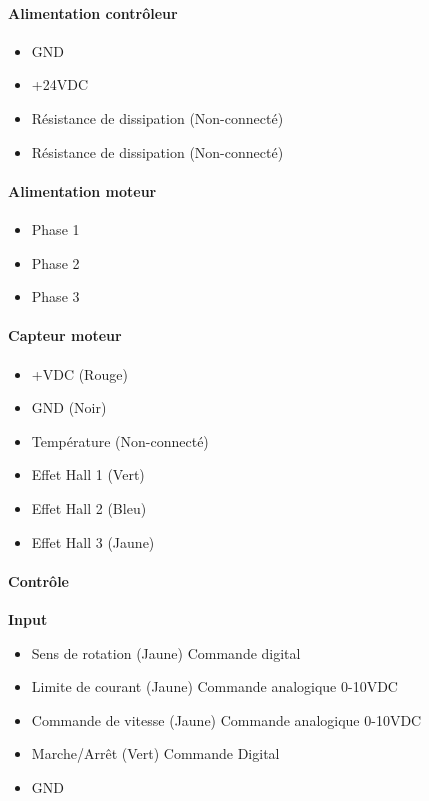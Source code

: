 \documentclass[11pt]{article}
\begin{document}
\paragraph{Alimentation contrôleur}
\begin{itemize}
	\item GND
	\item +24VDC
	\item Résistance de dissipation (Non-connecté)
	\item Résistance de dissipation (Non-connecté)
\end{itemize}

\paragraph{Alimentation moteur}

\begin{itemize}
	\item Phase 1
	\item Phase 2
	\item Phase 3
\end{itemize}

\paragraph{Capteur moteur}

\begin{itemize}
	\item +VDC (Rouge)
	\item GND (Noir)
	\item Température (Non-connecté)
	\item Effet Hall 1 (Vert)
	\item Effet Hall 2 (Bleu)
	\item Effet Hall 3 (Jaune)
\end{itemize}

\paragraph{Contrôle\\}

\textbf{Input} 

\begin{itemize}
	\item Sens de rotation (Jaune) Commande digital
	\item Limite de courant (Jaune) Commande analogique 0-10VDC
	\item Commande de vitesse (Jaune) Commande analogique 0-10VDC
	\item Marche/Arrêt (Vert) Commande Digital
	\item GND
\end{itemize}
\end{document}
